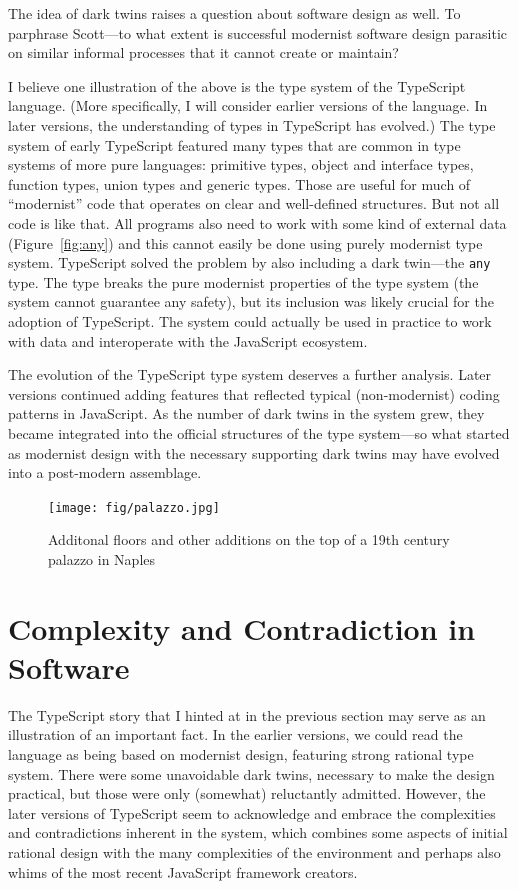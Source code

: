 The idea of dark twins raises a question about software design as well. To parphrase Scott---to
what extent is successful modernist software design parasitic on similar informal processes that
it cannot create or maintain?

I believe one illustration of the above is the type system of the TypeScript language.
(More specifically, I will consider earlier versions of the language. In later versions, the
understanding of types in TypeScript has evolved.) The type system of early TypeScript
featured many types that are common in type systems of more pure languages: primitive types,
object and interface types, function types, union types and generic types. Those are useful
for much of ``modernist'' code that operates on clear and well-defined structures. But not
all code is like that. All programs also need to work with some kind of external data
(Figure~\ref{fig:any}) and this cannot easily be done using purely modernist type system.
TypeScript solved the problem by also including a dark twin---the \texttt{any} type. The type
breaks the pure modernist properties of the type system (the system cannot guarantee any safety),
but its inclusion was likely crucial for the adoption of TypeScript. The system could actually
be used in practice to work with data and interoperate with the JavaScript ecosystem.

The evolution of the TypeScript type system deserves a further analysis. Later versions
continued adding features that reflected typical (non-modernist) coding patterns
in JavaScript. As the number of dark twins in the system grew, they became integrated into the
official structures of the type system---so what started as modernist design with the necessary
supporting dark twins may have evolved into a post-modern assemblage.

\begin{figure}
  \centering
  \texttt{[image: fig/palazzo.jpg]}
  \caption{Additonal floors and other additions on the top of a 19th century palazzo in Naples}
  \label{fig:palazzo}
\end{figure}

\section{Complexity and Contradiction in Software}

The TypeScript story that I hinted at in the previous section may serve as an illustration of an
important fact. In the earlier versions, we could read the language as being based on modernist
design, featuring strong rational type system. There were some unavoidable dark twins, necessary
to make the design practical, but those were only (somewhat) reluctantly admitted. However, the
later versions of TypeScript seem to acknowledge and embrace the complexities and contradictions
inherent in the system, which combines some aspects of initial rational design with the many
complexities of the environment and perhaps also whims of the most recent JavaScript framework
creators.


